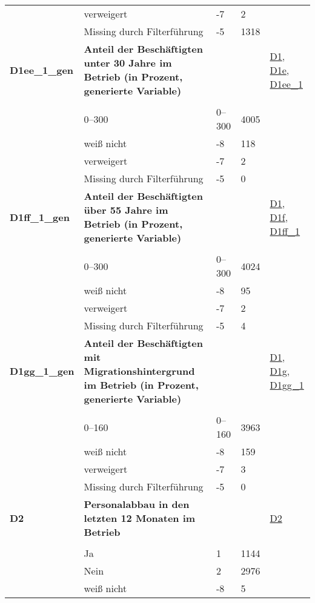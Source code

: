 \begin{longtable}{| L{2.5cm} | L{8.25cm}| C{1.5cm} | R{1.25cm} | C{2.25cm} |  }
   & verweigert & -7 & 2 &  \\ 
   & Missing durch Filterführung & -5 & 1318 &  \\ 
   \midrule
\textbf{D1ee\_1\_gen}\label{var:suf:D1ee:1:gen} & \textbf{Anteil der Beschäftigten unter 30 Jahre im Betrieb (in Prozent, generierte Variable)} &  &  & \hyperref[D1]{D1}, \hyperref[D1e]{D1e}, \hyperref[D1ee:1]{D1ee\_1} \\ 
   &  &  &  &  \\ 
   & 0--300 & 0--300 & 4005 &  \\ 
   & weiß nicht & -8 & 118 &  \\ 
   & verweigert & -7 & 2 &  \\ 
   & Missing durch Filterführung & -5 & 0 &  \\ 
   \midrule
\textbf{D1ff\_1\_gen}\label{var:suf:D1ff:1:gen} & \textbf{Anteil der Beschäftigten über 55 Jahre im Betrieb (in Prozent, generierte Variable)} &  &  & \hyperref[D1]{D1}, \hyperref[D1f]{D1f}, \hyperref[D1ff:1]{D1ff\_1} \\ 
   &  &  &  &  \\ 
   & 0--300 & 0--300 & 4024 &  \\ 
   & weiß nicht & -8 & 95 &  \\ 
   & verweigert & -7 & 2 &  \\ 
   & Missing durch Filterführung & -5 & 4 &  \\ 
   \midrule
\textbf{D1gg\_1\_gen}\label{var:suf:D1gg:1:gen} & \textbf{Anteil der Beschäftigten mit Migrationshintergrund im Betrieb (in Prozent, generierte Variable)} &  &  & \hyperref[D1]{D1}, \hyperref[D1g]{D1g}, \hyperref[D1gg:1]{D1gg\_1} \\ 
   &  &  &  &  \\ 
   & 0--160 & 0--160 & 3963 &  \\ 
   & weiß nicht & -8 & 159 &  \\ 
   & verweigert & -7 & 3 &  \\ 
   & Missing durch Filterführung & -5 & 0 &  \\ 
   \midrule
\textbf{D2}\label{var:suf:D2} & \textbf{Personalabbau in den letzten 12 Monaten im Betrieb} &  &  & \hyperref[D2]{D2} \\ 
   &  &  &  &  \\ 
   & Ja & 1 & 1144 &  \\ 
   & Nein & 2 & 2976 &  \\ 
   & weiß nicht & -8 & 5 &  \\ 

\end{longtable}
